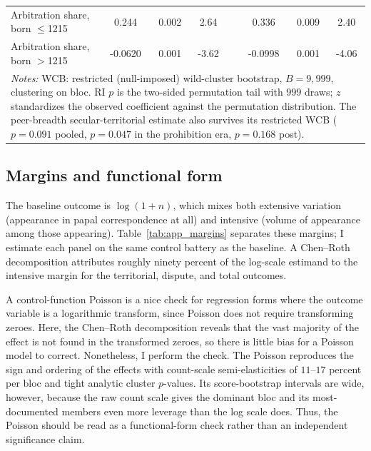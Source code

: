 \documentclass[12pt]{article}
\theoremstyle{definition}
\theoremstyle{remark}
\begin{document}
\begin{table}[t]
{\begin{tabular}{lccccccc}
Arbitration share, born $\leq$1215 & 0.244 & 0.002 & 2.64 & & 0.336 & 0.009 & 2.40 \\
Arbitration share, born $>$1215 & -0.0620 & 0.001 & -3.62 & & -0.0998 & 0.001 & -4.06 \\
\midrule
\multicolumn{8}{p{0.9\textwidth}}{\footnotesize \textit{Notes:} WCB: restricted (null-imposed) wild-cluster bootstrap, $B=9{,}999$, clustering on bloc. RI $p$ is the two-sided permutation tail with 999 draws; $z$ standardizes the observed coefficient against the permutation distribution. The peer-breadth secular-territorial estimate also survives its restricted WCB ($p=0.091$ pooled, $p=0.047$ in the prohibition era, $p=0.168$ post).} \\
\bottomrule
\end{tabular}
}
\end{table}



\subsection{Margins and functional form}

The baseline outcome is $\log(1+n)$, which mixes both extensive variation (appearance in papal correspondence at all) and intensive (volume of appearance among those appearing). Table~\ref{tab:app_margins} separates these margins; I estimate each panel on the same control battery as the baseline. A Chen--Roth decomposition attributes roughly ninety percent of the log-scale estimand to the intensive margin for the territorial, dispute, and total outcomes.

A control-function Poisson is a nice check for regression forms where the outcome variable is a logarithmic transform, since Poisson does not require transforming zeroes. Here, the Chen--Roth decomposition reveals that the vast majority of the effect is not found in the transformed zeroes, so there is little bias for a Poisson model to correct. Nonetheless, I perform the check. The Poisson reproduces the sign and ordering of the effects with count-scale semi-elasticities of $11$--$17$ percent per bloc and tight analytic cluster $p$-values. Its score-bootstrap intervals are wide, however, because the raw count scale gives the dominant bloc and its most-documented members even more leverage than the log scale does. Thus, the Poisson should be read as a functional-form check rather than an independent significance claim.
\end{document}

